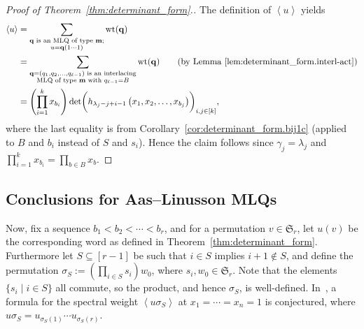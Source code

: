 \documentclass[reqno]{amsart}
\newcommand{\0}{\phantom{c}}
\newcommand{\swt}[1]{\left\langle #1 \right\rangle} %
\newcommand{\SymGp}[1]{\mathfrak{S}_{#1}} %
\DeclareMathOperator{\wt}{wt} %
\newcommand{\mm}{\mathbf{m}}
\newcommand{\qq}{\mathbf{q}}
\let\sumnonlimits\sum
\let\prodnonlimits\prod
\renewcommand{\sum}{\sumnonlimits\limits}
\renewcommand{\prod}{\prodnonlimits\limits}
\newcommand{\tup}[1]{\left( #1 \right)}
\newcommand{\ive}[1]{\left[ #1 \right]}
\theoremstyle{plain}
\theoremstyle{definition}
\numberwithin{equation}{section}
\begin{document}
\begin{proof}[Proof of Theorem~\ref{thm:determinant_form}.]
The definition of $\swt{u}$ yields
\begin{align*}
\swt{u} & = \sum_{\substack{\qq \text{ is an MLQ of type } \mm; \\ u=\qq(1\dotsm 1)}}\wt(\qq) \\
&  = \sum_{\substack{\qq = \tup{q_1, q_2, \dotsc, q_{\ell-1}} \text{ is an interlacing} \\\text{MLQ of type } \mm \text{ with } q_{\ell-1}=B}} \wt(\qq) \qquad \text{(by Lemma~\ref{lem:determinant_form.interl-act})} \\
&  = \left(  \prod_{i=1}^k x_{b_i} \right) \det\biggl( h_{\lambda_j-j+i-1}\left(x_1,x_2,\ldots,x_{b_j}\right)  \biggr)_{i, j \in \ive{k}} ,
\end{align*}
where the last equality is from Corollary~\ref{cor:determinant_form.bij1c} (applied to $B$ and $b_i$ instead of $S$ and $s_i$).
Hence the claim follows since $\gamma_j = \lambda_j$ and $ \prod_{i=1}^k x_{b_i} = \prod_{b \in B} x_b$.
\end{proof}


\subsection{Conclusions for Aas--Linusson MLQs}

Now, fix a sequence $b_1 < b_2 < \cdots < b_r$, and for a permutation $v \in \SymGp{r}$, let $u(v)$ be the corresponding word as defined in Theorem~\ref{thm:determinant_form}.
Furthermore let $S \subseteq \ive{r-1}$ be such that $i\in S$ implies $i+1 \notin S$, and define the permutation $\sigma_S := \left( \prod_{i \in S} s_i \right) w_0$, where $s_i, w_0 \in \SymGp{r}$.
Note that the elements $\{s_i \mid i \in S\}$ all commute, so the product, and hence $\sigma_S$, is well-defined.
In~\cite[Conj.~3.10]{AasLin17}, a formula for the spectral weight $\swt{u \sigma_S}$ at $x_1 = \cdots = x_n = 1$ is conjectured, where $u \sigma_S = u_{\sigma_S(1)} \cdots u_{\sigma_S(r)}$.
\end{document}
